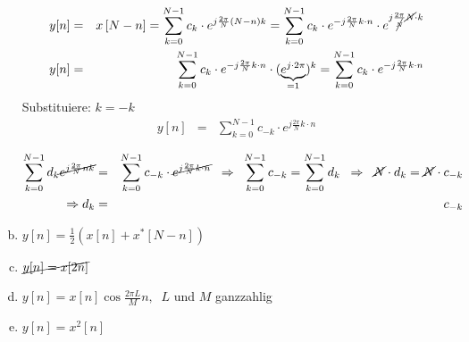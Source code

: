 \begin{uebsp}
\begin{Answer}
\begin{enumerate}[a)]
        \begin{eqnarray*}
            y[n]&=&x\left[N-n\right]=\sum_{k=0}^{N-1}c_k\cdot e^{j\frac{2\pi}{N}\left(N-n\right)k}=
            \sum_{k=0}^{N-1}c_k\cdot e^{-j\frac{2\pi}{N}k\cdot n}\cdot e^{j\frac{2\pi}{\cancel N}\cancel N\cdot k}\\
            y[n]&=&\sum_{k=0}^{N-1}c_k\cdot e^{-j\frac{2\pi}{N}k\cdot n}\cdot (\underbrace{e^{j\cdot 2\pi}}_{=1})^k=\sum_{k=0}^{N-1}c_k\cdot e^{-j\frac{2\pi}{N}k\cdot n}
        \end{eqnarray*}
        Substituiere: $k=-k$
        \begin{eqnarray*}
            y[n]&=&\sum_{k=0}^{N-1}c_{-k}\cdot e^{j\frac{2\pi}{N}k\cdot n}
        \end{eqnarray*}

        \begin{eqnarray*}
            \sum_{k=0}^{N-1}d_k\cancel{e^{j\frac{2\pi}{N}nk}}&=&\sum_{k=0}^{N-1}c_{-k}\cdot \cancel{e^{j\frac{2\pi}{N}k\cdot n}}\;\;\Rightarrow\;\;\sum_{k=0}^{N-1}c_{-k}=\sum_{k=0}^{N-1}d_{k}\;\;\Rightarrow\;\;\cancel N\cdot d_k=\cancel N\cdot c_{-k}\\
            \Rightarrow d_k&=&c_{-k}
        \end{eqnarray*}

        \item $y[n]=\frac{1}{2}\left(x[n]+x^*\left[N-n\right]\right)$
        \item $\cancel{y[n]=x[2n]}$
        \item $y[n]=x[n]\cos\frac{2\pi L}{M}n,\;\;L$ und $M$ ganzzahlig
        \item $y[n]=x^2[n]$
    \end{enumerate}
\end{Answer}
\end{uebsp}
